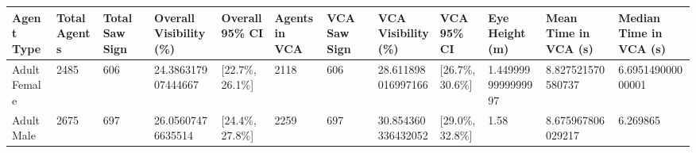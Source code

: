 \begin{tabular}{llllllllllll}
\hline
Agent Type & Total Agents & Total Saw Sign & Overall Visibility (\%) & Overall 95\% CI & Agents in VCA & VCA Saw Sign & VCA Visibility (\%) & VCA 95\% CI & Eye Height (m) & Mean Time in VCA (s) & Median Time in VCA (s) \\ \hline
Adult Female & 2485 & 606 & 24.386317907444667 & [22.7\%, 26.1\%] & 2118 & 606 & 28.611898016997166 & [26.7\%, 30.6\%] & 1.4499999999999997 & 8.827521570580737 & 6.695149000000001 \\
Adult Male & 2675 & 697 & 26.05607476635514 & [24.4\%, 27.8\%] & 2259 & 697 & 30.854360336432052 & [29.0\%, 32.8\%] & 1.58 & 8.675967806029217 & 6.269865 \\
\hline
\end{tabular}

